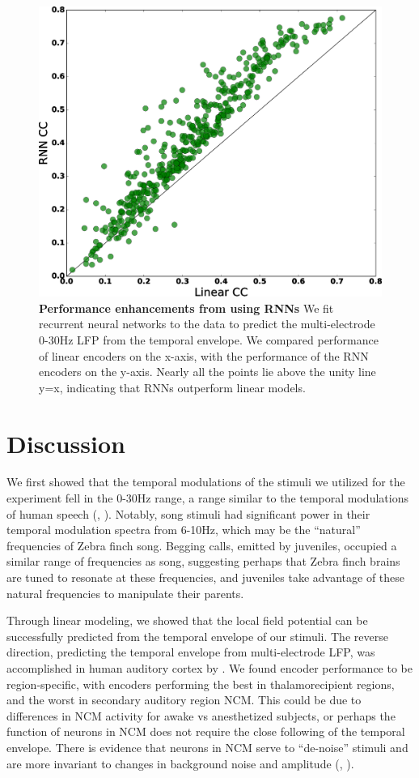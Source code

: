 \begin{figure}
    \caption{\textbf{Performance enhancements from using RNNs}  We fit recurrent neural networks to the data to predict the multi-electrode 0-30Hz LFP from the temporal envelope. We compared performance of linear encoders on the x-axis, with the performance of the RNN encoders on the y-axis. Nearly all the points lie above the unity line y=x, indicating that RNNs outperform linear models.
}
    \centering
    \includegraphics[scale=0.25]{figure_2_5.eps}
\end{figure}


\section{Discussion}

We first showed that the temporal modulations of the stimuli we utilized for the experiment fell in the 0-30Hz range, a range similar to the temporal modulations of human speech (\cite{Aiken2008}, \cite{Ding2016}). Notably, song stimuli had significant power in their temporal modulation spectra from 6-10Hz, which may be the ``natural'' frequencies of Zebra finch song. Begging calls, emitted by juveniles, occupied a similar range of frequencies as song, suggesting perhaps that Zebra finch brains are tuned to resonate at these frequencies, and juveniles take advantage of these natural frequencies to manipulate their parents.

Through linear modeling, we showed that the local field potential can be successfully predicted from the temporal envelope of our stimuli. The reverse direction, predicting the temporal envelope from multi-electrode LFP, was accomplished in human auditory cortex by \cite{Pasley2012}. We found encoder performance to be region-specific, with encoders performing the best in thalamorecipient regions, and the worst in secondary auditory region NCM. This could be due to differences in NCM activity for awake vs anesthetized subjects, or perhaps the function of neurons in NCM does not require the close following of the temporal envelope. There is evidence that neurons in NCM serve to ``de-noise'' stimuli and are more invariant to changes in background noise and amplitude (\cite{Schneider2013}, \cite{Moore2013}).

